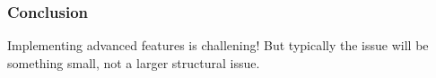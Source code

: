\begin{frame}
  \frametitle{Conclusion}
    Implementing advanced features is challening! But typically the issue will
    be something small, not a larger structural issue.
\end{frame}

